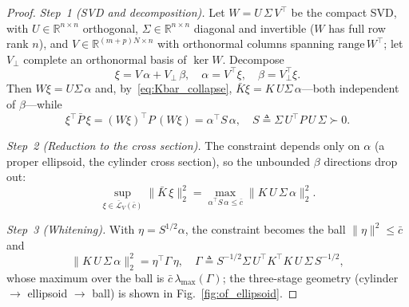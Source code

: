 \documentclass[final,5p,times,authoryear]{elsarticle}
\theoremstyle{plain}
\theoremstyle{definition}
\theoremstyle{remark}
\begin{document}
\begin{proof}
\textit{Step~1 (SVD and decomposition).}  Let
$W = U\,\Sigma\,V^{\!\top}$ be the compact SVD, with
$U \in \mathbb{R}^{n\times n}$ orthogonal,
$\Sigma \in \mathbb{R}^{n\times n}$ diagonal and invertible ($W$ has
full row rank $n$), and $V \in \mathbb{R}^{(m+p)N\times n}$ with
orthonormal columns spanning $\mathrm{range}\,W^{\!\top}$; let
$V_{\perp}$ complete an orthonormal basis of $\ker W$.  Decompose
\begin{equation}
\xi = V\,\alpha + V_{\perp}\,\beta,
\quad \alpha = V^{\!\top}\!\xi,
\quad \beta = V_{\perp}^{\!\top}\!\xi.
\label{eq:xi_decomp}
\end{equation}
Then $W\xi = U\Sigma\,\alpha$ and, by~\eqref{eq:Kbar_collapse},
$\bar K\xi = K\,U\Sigma\,\alpha$---both independent of $\beta$---while
\begin{equation}
\xi^{\!\top}\!\bar P\,\xi
   = (W\xi)^{\!\top}\!P\,(W\xi)
   = \alpha^{\!\top}\!S\,\alpha,
\quad S \triangleq \Sigma\,U^{\!\top}\!P\,U\,\Sigma \succ 0.
\label{eq:constraint_alpha}
\end{equation}

\textit{Step~2 (Reduction to the cross section).}  The constraint
depends only on $\alpha$ (a proper ellipsoid, the cylinder cross
section), so the unbounded $\beta$ directions drop out:
\begin{equation}
\sup_{\xi \in \bar{\mathcal L}_V(\bar c)} \|\bar K\,\xi\|_2^2
   = \max_{\alpha^{\!\top}\!S\,\alpha \leq \bar c}
     \|K\,U\,\Sigma\,\alpha\|_2^2.
\label{eq:reduced_problem}
\end{equation}

\textit{Step~3 (Whitening).}  With $\eta = S^{1/2}\alpha$, the
constraint becomes the ball $\|\eta\|^2 \leq \bar c$ and
\begin{equation}
\|K\,U\,\Sigma\,\alpha\|_2^2 = \eta^{\!\top}\Gamma\,\eta,
\quad
\Gamma \triangleq
S^{-1/2}\Sigma\,U^{\!\top}\!K^{\!\top}\!K\,U\,\Sigma\,S^{-1/2},
\label{eq:whitening}
\end{equation}
whose maximum over the ball is $\bar c\,\lambda_{\max}(\Gamma)$; the
three-stage geometry (cylinder $\to$ ellipsoid $\to$ ball) is shown in
Fig.~\ref{fig:of_ellipsoid}.


\end{proof}
\end{document}
